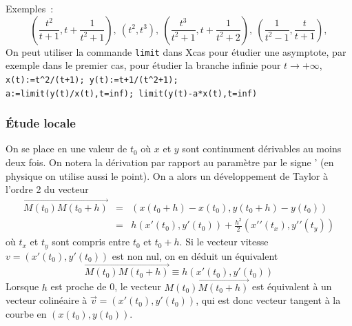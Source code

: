 \documentclass[a4paper,11pt]{article}
\begin{document}
Exemples~: 
$$ (\frac{t^2}{t+1},t+\frac1{t^2+1}), \
(t^2,t^3), \
(\frac{t^3}{t^2+1},t+\frac{1}{t^2+2}), \
(\frac{1}{t^2-1},\frac{t}{t+1}), $$
On peut utiliser la commande \verb|limit| dans Xcas pour \'etudier
une asymptote, par exemple dans le premier cas, pour \'etudier la
branche infinie pour $t \rightarrow +\infty$, \\
\verb|x(t):=t^2/(t+1); y(t):=t+1/(t^2+1);|\\
\verb|a:=limit(y(t)/x(t),t=inf); limit(y(t)-a*x(t),t=inf)|

\subsubsection{\'Etude locale}
On se place en une valeur de $t_0$ o\`u $x$ et $y$ sont continument
d\'erivables au moins deux fois. On notera la dérivation par rapport 
au paramètre par le signe ' (en physique on utilise aussi le point).
On a alors un d\'eveloppement de Taylor \`a l'ordre 2
du vecteur
\begin{eqnarray*}
\overrightarrow{M(t_0)M(t_0+h)}&=&(x(t_0+h)-x(t_0),y(t_0+h)-y(t_0)) 
\\ &=& h
(x'(t_0),y'(t_0))+\frac{h^2}{2}(x'{'}(t_x),y'{'}(t_y))
\end{eqnarray*}
o\`u $t_x$ et $t_y$ sont compris entre $t_0$ et $t_0+h$.
Si le vecteur vitesse $v=(x'(t_0),y'(t_0))$ est non nul, on en d\'eduit
un \'equivalent
$$\overrightarrow{M(t_0)M(t_0+h)} \equiv h (x'(t_0),y'(t_0))$$
Lorsque $h$ est proche de 0, le vecteur $\overrightarrow{M(t_0)M(t_0+h)}$
est \'equivalent \`a un vecteur colin\'eaire \`a $\overrightarrow{v}=(x'(t_0),y'(t_0))$,
qui est donc vecteur tangent \`a la courbe en $(x(t_0),y(t_0))$.
\end{document}
